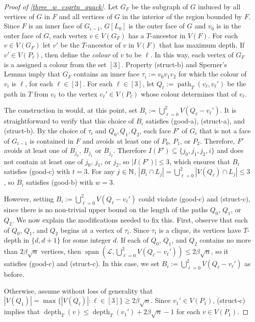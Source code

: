 \documentclass{patmorin}
\newcommand{\defin}[1]{\emph{\textcolor{brightmaroon}{#1}}}
\DeclareMathOperator{\spn}{span}
\DeclareMathOperator{\depth}{depth}
\DeclareMathOperator{\pth}{path}
\begin{document}
\begin{proof}[Proof of \cref{three_w_csqrtn_quack}]
  Let $G_F$ be the subgraph of $G$ induced by all vertices of $G$ in $F$ and all vertices of $G$ in the interior of the region bounded by $F$.  Since $F$ is an inner face of $G_{i-1}$, $G[L_0]$ is the outer face of $G$ and $v_0$ is in the outer face of $G$, each vertex $v\in V(G_F)$ has a $T$-ancestor in $V(F)$.  For each $v\in V(G_F)$ let $v'$ be the $T$-ancestor of $v$ in $V(F)$ that has maximum depth.   If $v'\in V(P_\ell)$, then define the \defin{colour} of $v$ to be $\ell$.  In this way, each vertex of $G_F$ is a assigned a colour from the set $[3]$.  Property (struct-b) and Sperner's Lemma imply that $G_F$ contains an inner face $\tau_i:=v_0v_1v_2$ for which the colour of $v_i$ is $\ell$, for each $\ell\in[3]$.  For each $\ell\in[3]$, let $Q_\ell:=\pth_T(v_\ell,v_\ell')$ be the path in $T$ from $v_\ell$ to the vertex $v_{\ell}'\in V(P_{\ell})$ whose colour determines that of $v_\ell$.

  The construction in \citet{dujmovic.joret.ea:planar} would, at this point, set $B_i:=\bigcup_{\ell=0}^2 V(Q_\ell-v_\ell')$.
  It is straightforward to verify that this choice of $B_i$ satisfies (good-a), (struct-a), and (struct-b).  By the choice of $\tau_i$ and $Q_0,Q_1,Q_2$, each face $F'$ of $G_i$ that is not a face of $G_{i-1}$ is contained in $F$ and avoids at least one of $P_0$, $P_1$, or $P_2$. Therefore, $F'$ avoids at least one of $B_{j_0}$, $B_{j_1}$ or $B_{j_2}$. Therefore $I(F')\subseteq \{j_0,j_1,j_2,i\}$ and does not contain at least one of $j_0$, $j_1$, or $j_2$, so $|I(F')|\le 3$, which ensures that $B_i$ satisfies (good-c) with $t=3$.  For any $j\in\mathbb{N}$, $|B_i\cap L_j|=\bigcup_{\ell=0}^2|V(Q_\ell)\cap L_j|\le 3$, so $B_i$ satisfies (good-b) with $w=3$.

  However, setting $B_i:=\bigcup_{\ell=0}^2 V(Q_\ell-v_\ell')$ could violate (good-c) and (struct-c), since there is no non-trivial upper bound on the length of the paths $Q_0$, $Q_1$, or $Q_2$.  We now explain the modifications needed to fix this.  First, observe that each of $Q_0$, $Q_1$, and $Q_2$ begins at a vertex of $\tau_i$.  Since $\tau_i$ is a clique, its vertices have $T$-depth in $\{d,d+1\}$ for some integer $d$. If each of $Q_0$, $Q_1$, and $Q_2$ contains no more than $2\beta\sqrt{n}$ vertices, then $\spn(\mathcal{L},\bigcup_{\ell=0}^2 V(Q_\ell-v_\ell'))\le 2\beta\sqrt{n}$, so it satisfies (good-c) and (struct-c). In this case, we set $B_i:=\bigcup_{\ell=0}^2 V(Q_\ell-v_\ell')$ as before.

  Otherwise, assume without loss of generality that $|V(Q_1)|=\max\{|V(Q_\ell)|:\ell\in[3]\}\ge 2\beta\sqrt{n}$.  Since $v_1'\in V(P_1)$, (struct-c) implies that $\depth_T(v)\le \depth_T(v_1')+2\beta\sqrt{n}-1$ for each $v\in V(P_1)$.


\end{proof}
\end{document}
